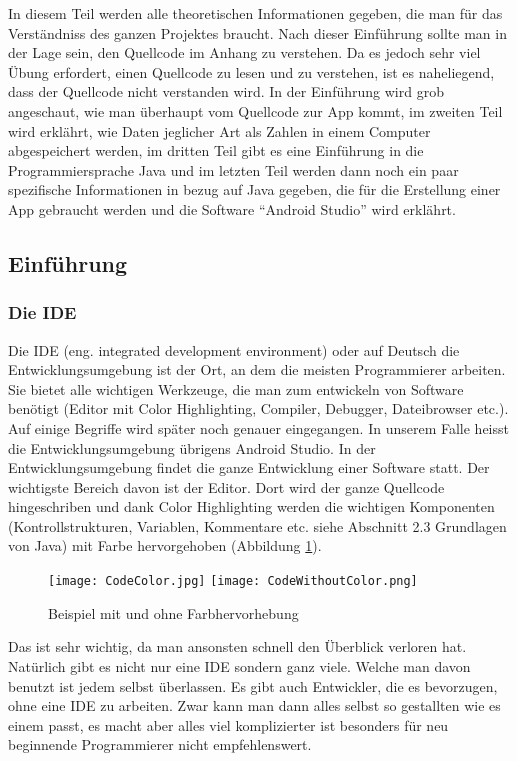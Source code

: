 In diesem Teil werden alle theoretischen Informationen gegeben, die man für das Verständniss des ganzen Projektes braucht. Nach dieser Einführung sollte man in der Lage sein, den Quellcode im Anhang zu verstehen. Da es jedoch sehr viel Übung erfordert, einen Quellcode zu lesen und zu verstehen, ist es naheliegend, dass der Quellcode nicht verstanden wird. In der Einführung wird grob angeschaut, wie man überhaupt vom Quellcode zur App kommt, im zweiten Teil wird erklährt, wie Daten jeglicher Art als Zahlen in einem Computer abgespeichert werden, im dritten Teil gibt es eine Einführung in die Programmiersprache Java und im letzten Teil werden dann noch ein paar spezifische Informationen in bezug auf Java gegeben, die für die Erstellung einer App gebraucht werden und die Software "`Android Studio"' wird erklährt.

\subsection{Einführung}
\subsubsection{Die IDE}
Die IDE (eng. integrated development environment) oder auf Deutsch die Entwicklungsumgebung ist der Ort, an dem die meisten Programmierer arbeiten. Sie bietet alle wichtigen Werkzeuge, die man zum entwickeln von Software benötigt (Editor mit Color Highlighting, Compiler, Debugger, Dateibrowser etc.). Auf einige Begriffe wird später noch genauer eingegangen. In unserem Falle heisst die Entwicklungsumgebung übrigens Android Studio. In der Entwicklungsumgebung findet die ganze Entwicklung einer Software statt. Der wichtigste Bereich davon ist der Editor. Dort wird der ganze Quellcode hingeschriben und dank Color Highlighting werden die wichtigen Komponenten (Kontrollstrukturen, Variablen, Kommentare etc. siehe Abschnitt 2.3 Grundlagen von Java) mit Farbe hervorgehoben (Abbildung \ref{fig:Colorhighlighting}).
\begin{figure}[htbp] 
  \centering
     \texttt{[image: CodeColor.jpg]}
     \texttt{[image: CodeWithoutColor.png]}
  \caption{Beispiel mit und ohne Farbhervorhebung \cite{Colorhighlighting}}
  \label{fig:Colorhighlighting}
\end{figure}
Das ist sehr wichtig, da man ansonsten schnell den Überblick verloren hat. Natürlich gibt es nicht nur eine IDE sondern ganz viele. Welche man davon benutzt ist jedem selbst überlassen. Es gibt auch Entwickler, die es bevorzugen, ohne eine IDE zu arbeiten. Zwar kann man dann alles selbst so gestallten wie es einem passt, es macht aber alles viel komplizierter ist besonders für neu beginnende Programmierer nicht empfehlenswert.

